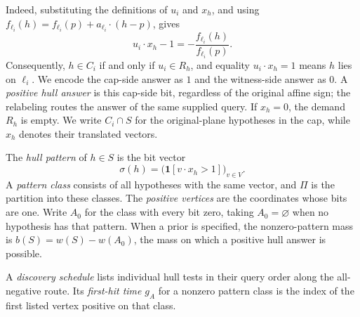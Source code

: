 Indeed, substituting the definitions of $u_i$ and $x_h$, and using
$f_{\ell_i}(h)=f_{\ell_i}(p)+a_{\ell_i}\cdot(h-p)$, gives
\[
 u_i\cdot x_h-1=-\frac{f_{\ell_i}(h)}{f_{\ell_i}(p)}.
\]
Consequently, $h\in C_i$ if and only if $u_i\in R_h$, and equality
$u_i\cdot x_h=1$ means $h$ lies on $\ell_i$.
We encode the cap-side answer as $1$ and the witness-side answer
as $0$. A \emph{positive hull answer} is this cap-side bit,
regardless of the original affine sign; the relabeling routes the
answer of the same supplied query. If $x_h=0$, the demand $R_h$ is empty.
We write $C_i\cap S$ for the original-plane hypotheses in the cap,
while $x_h$ denotes their translated vectors.

\begin{definition}\label{def:hull-pattern}
The \emph{hull pattern} of $h\in S$ is the bit vector
\[
 \sigma(h)=\bigl(\mathbf1[v\cdot x_h>1]\bigr)_{v\in V}.
\]
A \emph{pattern class} consists of all hypotheses with the same
vector, and $\Pi$ is the partition into these classes.
The \emph{positive vertices} are the coordinates whose bits are one.
Write $A_0$ for the class with every bit zero, taking
$A_0=\varnothing$ when no hypothesis has that pattern.
When a prior is specified, the nonzero-pattern mass is
$b(S)=w(S)-w(A_0)$, the mass on which a positive hull answer is possible.
\end{definition}

A \emph{discovery schedule} lists individual hull tests in their
query order along the all-negative route. Its \emph{first-hit time}
$g_A$ for a nonzero pattern class is the index of the first listed
vertex positive on that class.
